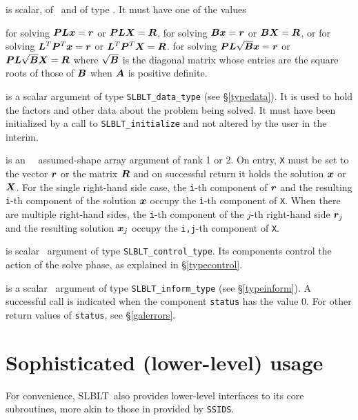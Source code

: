 \documentclass{galahad}
\newcommand{\packagename}{SLBLT}
\begin{document}
\begin{description}
 is scalar, of \intentin\, and of type \character. It
must have one of the values
\begin{description}
 for solving ${\bm{P}} {\bm{L}} {\bm{x}} =  {\bm{r}}$ or
                     ${\bm{P}} {\bm{L}} {\bm{X}} =  {\bm{R}}$,
 for solving ${\bm{B}} {\bm{x}} =  {\bm{r}}$ or
                  ${\bm{B}} {\bm{X}} =  {\bm{R}}$, or
 for solving ${\bm{L}}^T {\bm{P}}^T {\bm{x}} =  {\bm{r}}$ or
                  ${\bm{L}}^T {\bm{P}}^T {\bm{X}} = {\bm{R}}$.
 for solving ${\bm{P}} {\bm{L}} \sqrt{{\bm{B}}} {\bm{x}} =  {\bm{r}}$ or
                  ${\bm{P}} {\bm{L}} \sqrt{{\bm{B}}} {\bm{X}} =  {\bm{R}}$
where $\sqrt{{\bm{B}}}$ is the diagonal matrix whose entries are the
square roots of those of ${\bm{B}}$ when ${\bm{A}}$ is positive definite.
\end{description}

 is a scalar \intentinout argument of type
{\tt \packagename\_data\_type}
(see \S\ref{typedata}). It is used to hold the factors and other
data about the problem being solved.
It must have been initialized by a call to
{\tt \packagename\_ini\-tialize} and not altered by the user in the interim.

 is an \intentinout\ \realdp\ assumed-shape array argument of 
rank 1 or 2. On entry, {\tt X} must be set
to the vector ${\bm{r}}$ or the matrix ${\bm{R}}$ and on successful return it holds
the solution ${\bm{x}}$ or ${\bm{X}}$. For the single right-hand side case, the
{\tt i}-th component of ${\bm{r}}$ and the resulting
{\tt i}-th component of the solution ${\bm{x}}$
occupy the {\tt i}-th component of {\tt X}. When there are multiple
right-hand sides, the
{\tt i}-th component of the $j$-th right-hand side ${\bm{r}}_j$
and the resulting solution ${\bm{x}}_j$ occupy the
{\tt i,j}-th component of {\tt X}.

 is scalar \intentin\ argument of type
{\tt \packagename\_control\_type}. Its components control the action
of the solve phase, as explained in
\S\ref{typecontrol}.

 is a scalar \intentinout\ argument of type
{\tt \packagename\_inform\_type}
(see \S\ref{typeinform}).
A successful call is indicated when the  component {\tt status} has the value 0.
For other return values of {\tt status}, see \S\ref{galerrors}.

\end{description}


\section{Sophisticated (lower-level) usage}\label{sophisticated}
For convenience, \packagename\ also provides lower-level interfaces to its core
subroutines, more akin to those in provided by {\tt SSIDS}.
\end{document}
